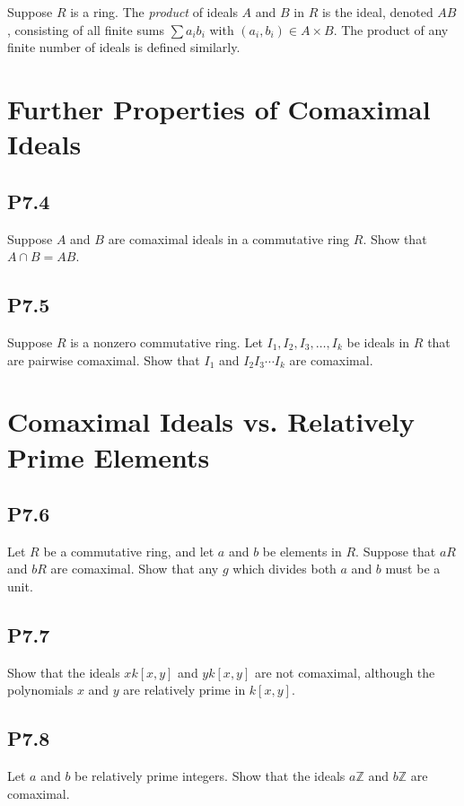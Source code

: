 \documentclass[lang=cn,11pt]{template}
\begin{document}
\begin{definition}
Suppose \( R \) is a ring. The \textit{product} of ideals \( A \) and \( B \) in \( R \) is the ideal, denoted \( AB \), consisting of all finite sums \( \sum a_i b_i \) with \( (a_i, b_i) \in A \times B \). The product of any finite number of ideals is defined similarly.
\end{definition}

\section{Further Properties of Comaximal Ideals}

\subsection*{P7.4} Suppose \( A \) and \( B \) are comaximal ideals in a commutative ring \( R \). Show that \( A \cap B = AB \).

\subsection*{P7.5} Suppose \( R \) is a nonzero commutative ring. Let \( I_1, I_2, I_3, \ldots, I_k \) be ideals in \( R \) that are pairwise comaximal. Show that \( I_1 \) and \( I_2 I_3 \cdots I_k \) are comaximal.

\section{Comaximal Ideals vs. Relatively Prime Elements}

\subsection*{P7.6} Let \( R \) be a commutative ring, and let \( a \) and \( b \) be elements in \( R \). Suppose that \( aR \) and \( bR \) are comaximal. Show that any \( g \) which divides both \( a \) and \( b \) must be a unit.

\subsection*{P7.7} Show that the ideals \( xk[x, y] \) and \( yk[x, y] \) are not comaximal, although the polynomials \( x \) and \( y \) are relatively prime in \( k[x, y] \).

\subsection*{P7.8} Let \( a \) and \( b \) be relatively prime integers. Show that the ideals \( a\mathbb{Z} \) and \( b\mathbb{Z} \) are comaximal.
\end{document}
